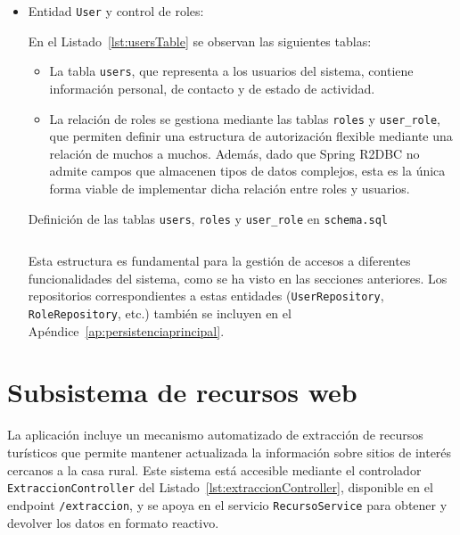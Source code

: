 \begin{itemize}
   
    \item Entidad \texttt{User} y control de roles: 

   En el Listado~\ref{lst:usersTable} se observan las siguientes tablas:

\begin{itemize}
    \item La tabla \texttt{users}, que representa a los usuarios del sistema, contiene información personal, de contacto y de estado de actividad.
    
    \item La relación de roles se gestiona mediante las tablas \texttt{roles} y \texttt{user\_role}, que permiten definir una estructura de autorización flexible mediante una relación de muchos a muchos. Además, dado que Spring R2DBC no admite campos que almacenen tipos de datos complejos, esta es la única forma viable de implementar dicha relación entre roles y usuarios.
\end{itemize}
 \begin{longlisting}
        \caption{Definición de las tablas \texttt{users}, \texttt{roles} y \texttt{user\_role} en {\tt schema.sql}}
        \inputminted[firstline=1,lastline=28]{sql}{../backend/elrincondeeva/elrincondeeva/src/main/resources/schema.sql}
        \label{lst:usersTable}
    \end{longlisting}
    Esta estructura es fundamental para la gestión de accesos a diferentes funcionalidades del sistema, como se ha visto en las secciones anteriores. Los repositorios correspondientes a estas entidades (\texttt{UserRepository}, \texttt{RoleRepository}, etc.) también se incluyen en el Apéndice~\ref{ap:persistenciaprincipal}.
    
    
\end{itemize}



\section{Subsistema de recursos web}
La aplicación incluye un mecanismo automatizado de extracción de recursos turísticos que permite mantener actualizada la información sobre sitios de interés cercanos a la casa rural. Este sistema está accesible mediante el controlador \texttt{ExtraccionController} del Listado~\ref{lst:extraccionController}, disponible en el endpoint \texttt{/extraccion}, y se apoya en el servicio \texttt{RecursoService} para obtener y devolver los datos en formato reactivo.

